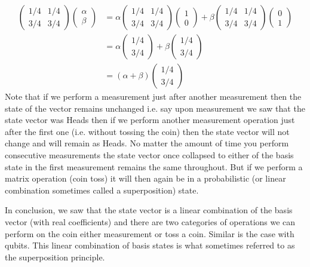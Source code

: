 \documentclass[12pt, oneside]{book}
\theoremstyle{definition}
\theoremstyle{definition}
\theoremstyle{remark}
\begin{document}
\begin{align*}
\begin{pmatrix} 1/4 & 1/4 \\3/4 & 3/4 \end{pmatrix} \begin{pmatrix} \alpha \\ \beta \end{pmatrix} &= \alpha \begin{pmatrix} 1/4 & 1/4 \\3/4 & 3/4 \end{pmatrix} \begin{pmatrix} 1 \\ 0 \end{pmatrix} + \beta \begin{pmatrix} 1/4 & 1/4 \\3/4 & 3/4 \end{pmatrix} \begin{pmatrix} 0 \\ 1 \end{pmatrix}\\
&= \alpha \begin{pmatrix} 1/4 \\ 3/4 \end{pmatrix} + \beta \begin{pmatrix} 1/4 \\ 3/4 \end{pmatrix}\\
&=(\alpha + \beta) \begin{pmatrix} 1/4 \\ 3/4 \end{pmatrix}
\end{align*}
Note that if we perform a measurement just after another measurement then the state of the vector remains unchanged i.e. say upon measurement we saw that the state vector was Heads then if we perform another measurement operation just after the first one (i.e. without tossing the coin) then the state vector will not change and will remain as Heads. No matter the amount of time you perform consecutive measurements the state vector once collapsed to either of the basis state in the first measurement remains the same throughout. But if we perform a matrix operation (coin toss) it will then again be in a probabilistic (or linear combination sometimes called a superposition) state.

In conclusion, we saw that the state vector is a linear combination of the basis vector (with real coefficients) and there are two categories of operations we can perform on the coin either measurement or toss a coin. Similar is the case with qubits. This linear combination of basis states is what sometimes referred to as the superposition principle.
\end{document}
